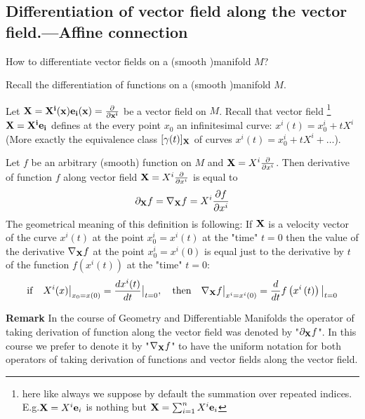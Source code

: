 \documentclass[12pt]{article}
\theoremstyle{theorem}
\numberwithin{equation}{section}
\begin{document}
\subsection {Differentiation of vector field along the vector field.---Affine connection}

How to differentiate vector fields on a (smooth )manifold  $M$?


Recall  the differentiation  of functions on a (smooth )manifold  $M$.







Let $\bf X=X^i(x){\bf e}_i(x)={\partial\over \partial x^i}$ be a vector field on $M$.
Recall that vector field
\footnote{here like always we suppose by default the summation over repeated indices.
E.g.${\bf X}=X^i{\bf e}_i$ is nothing but
${\bf X}=\sum_{i=1}^nX^i{\bf e}_i$}
 $\bf X=X^i{\bf e}_i$ defines at the
every point $x_0$ an infinitesimal curve: $x^i(t)=x^i_0+tX^i$
(More exactly the equivalence class $[\gamma(t)]_{\bf X} $
of curves $x^i(t)=x^i_0+tX^i+\dots$).


Let $f$ be an arbitrary (smooth) function on $M$ and ${\bf X}=X^i{\partial\over \partial x^i}$.
 Then derivative
of function $f$ along vector field ${\bf X}=X^i{\partial\over \partial x^i}$ is equal to
                              $$
             \partial_{\bf X}f= \nabla_{\bf X}f
                  =X^i{\partial f\over \partial x^i}
                                $$
The geometrical meaning of this definition is following:
If ${\bf X}$ is a velocity vector of the curve $x^i(t)$ at the point $x^i_0=x^i(t)$ at the "time"
$t=0$ then the value of the derivative $\nabla_{\bf X}f$ at the point $x^i_0=x^i(0)$
is equal just to the derivative by $t$ of the function $f(x^i(t))$ at the "time" $t=0$:
\begin{equation}\label{meaningofderivative}
{\rm if}\quad
    X^i(x)\big\vert_{x_0=x(0)}={dx^i(t)\over dt}\big\vert_{t=0},\quad
    {\rm then}\quad
\nabla_{\bf X} f\big\vert_{x^i=x^i(0)}=
{d\over dt}f\left(x^i\left(t\right)\right)\big\vert_{t=0}
\end{equation}


{\bf Remark} In the course of Geometry and Differentiable Manifolds the operator
 of taking derivation of function along the vector field
was denoted by "$\partial_{\bf X}f$". In this course we prefer to denote it by "$\nabla_{\bf X}f$"
to have the uniform notation for both operators of taking derivation of functions and vector fields
along the vector field.
\end{document}
